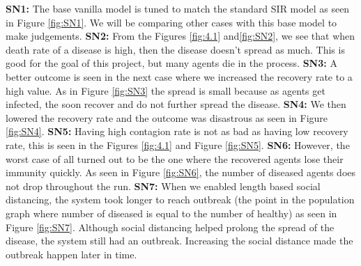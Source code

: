 \documentclass[a4paper,11pt]{article}
\begin{document}
    \textbf{SN1:} The base vanilla model is tuned to match the standard SIR model as seen in Figure \ref{fig:SN1}.
    We will be comparing other cases with this base model to make judgements.
    \textbf{SN2:} From the Figures \ref{fig:4.1} and\ref{fig:SN2}, we see that when death rate of a disease is high, then the disease doesn't spread as much.
    This is good for the goal of this project, but many agents die in the process.
    \textbf{SN3:} A better outcome is seen in the next case where we increased the recovery rate to a high value.
    As in Figure \ref{fig:SN3} the spread is small because as agents get infected, the soon recover and do not further spread the disease.
    \textbf{SN4:} We then lowered the recovery rate and the outcome was disastrous as seen in Figure \ref{fig:SN4}.
    \textbf{SN5:} Having high contagion rate is not as bad as having low recovery rate, this is seen in the Figures \ref{fig:4.1} and Figure \ref{fig:SN5}.
    \textbf{SN6:} However, the worst case of all turned out to be the one where the recovered agents lose their immunity quickly.
    As seen in Figure \ref{fig:SN6}, the number of diseased agents does not drop throughout the run.
    \textbf{SN7:} When we enabled length based social distancing\cite{3b1b}, the system took longer to reach outbreak (the point in the population graph where number of diseased is equal to the number of healthy) as seen in Figure \ref{fig:SN7}.
    Although social distancing helped prolong the spread of the disease, the system still had an outbreak.
    Increasing the social distance made the outbreak happen later in time.
\end{document}
